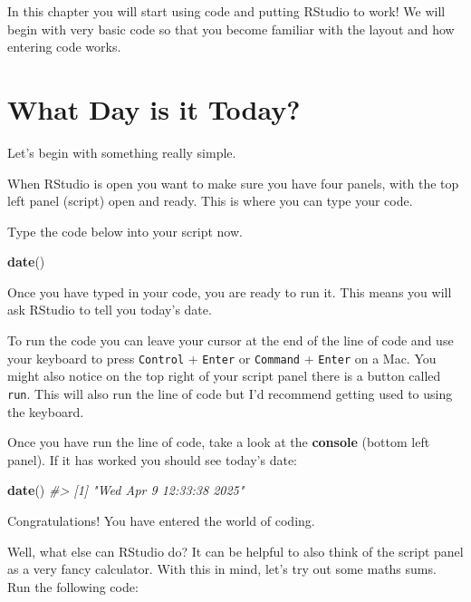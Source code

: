\documentclass[
]{book}
\newenvironment{Shaded}{\begin{snugshade}}{\end{snugshade}}
\newcommand{\CommentTok}[1]{\textcolor[rgb]{0.56,0.35,0.01}{\textit{#1}}}
\newcommand{\FunctionTok}[1]{\textcolor[rgb]{0.13,0.29,0.53}{\textbf{#1}}}
\newcommand{\NormalTok}[1]{#1}
\let\oldsection\section
\renewcommand{\section}{\needspace{5\baselineskip}\oldsection}
\begin{document}
In this chapter you will start using code and putting RStudio to work! We will begin with very basic code so that you become familiar with the layout and how entering code works.

\section{What Day is it Today?}\label{what-day-is-it-today}

Let's begin with something really simple.

When RStudio is open you want to make sure you have four panels, with the top left panel (script) open and ready. This is where you can type your code.

Type the code below into your script now.

\begin{Shaded}
\begin{Highlighting}[]
\FunctionTok{date}\NormalTok{()}
\end{Highlighting}
\end{Shaded}

Once you have typed in your code, you are ready to run it. This means you will ask RStudio to tell you today's date.

To run the code you can leave your cursor at the end of the line of code and use your keyboard to press \texttt{Control} + \texttt{Enter} or \texttt{Command} + \texttt{Enter} on a Mac. You might also notice on the top right of your script panel there is a button called \texttt{run}. This will also run the line of code but I'd recommend getting used to using the keyboard.

\newpage

Once you have run the line of code, take a look at the \textbf{console} (bottom left panel). If it has worked you should see today's date:

\begin{Shaded}
\begin{Highlighting}[]
\FunctionTok{date}\NormalTok{()}
\CommentTok{\#\textgreater{} [1] "Wed Apr  9 12:33:38 2025"}
\end{Highlighting}
\end{Shaded}

Congratulations! You have entered the world of coding.

Well, what else can RStudio do? It can be helpful to also think of the script panel as a very fancy calculator. With this in mind, let's try out some maths sums. Run the following code:
\end{document}
